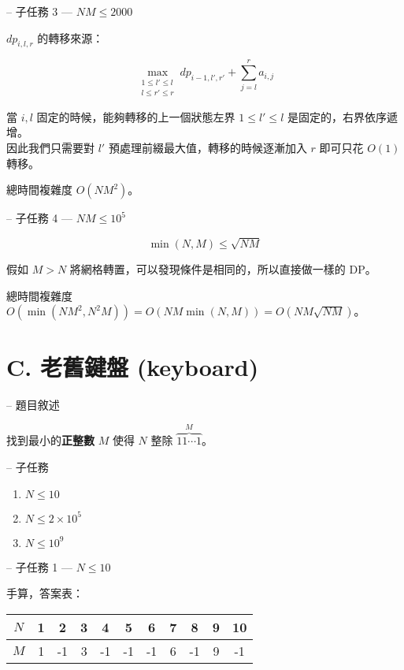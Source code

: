 \documentclass[hyperref,UTF8,notheorems,xcolor={dvipsnames}]{beamer}
\newcommand{\btitle}[1]{{\secname} -- #1}
\theoremstyle{definition}
\begin{document}
\begin{frame}[fragile]{\btitle{子任務 3 --- $NM \leq 2000$}}
	
	$dp_{i, l, r}$ 的轉移來源：
	
	\[ \max_{\substack{1 \leq l' \leq l \\ l \leq r' \leq r}} dp_{i-1, l', r'} + \sum_{j=l}^{r}a_{i,j} \]
	
	當 $i, l$ 固定的時候，能夠轉移的上一個狀態左界 $1 \leq l' \leq l$ 是固定的，右界依序遞增。\\
	因此我們只需要對 $l'$ 預處理前綴最大值，轉移的時候逐漸加入 $r$ 即可只花 $O(1)$ 轉移。

	總時間複雜度 $O(NM^2)$。  

\end{frame}

\begin{frame}[fragile]{\btitle{子任務 4 --- $NM \leq 10^5$}}
	
	\[ \min(N, M) \leq \sqrt{NM} \]

	假如 $M > N$ 將網格轉置，可以發現條件是相同的，所以直接做一樣的 DP。  

	總時間複雜度 $O(\min(NM^2, N^2M)) = O(NM\min(N, M)) = O(NM\sqrt{NM})$。  

\end{frame}

\section{C. 老舊鍵盤 (keyboard)}

\begin{frame}[fragile]{\btitle{題目敘述}}

	找到最小的\textbf{正整數} $M$ 使得 $N$ 整除 $\overset{M}{\overbrace{11\cdots1}}$。
\end{frame}

\begin{frame}[fragile]{\btitle{子任務}}
	\begin{enumerate}
		\item $N \leq 10$
		\item $N \leq 2 \times 10^5$
		\item $N \leq 10^9$
	\end{enumerate}
\end{frame}

\begin{frame}[fragile]{\btitle{子任務 1 --- $N \leq 10$}}
	
	手算，答案表：

	\begin{tabular}{c|c|c|c|c|c|c|c|c|c|c}
	$N$ & 1 & 2 & 3 & 4 & 5 & 6 & 7 & 8 & 9 & 10 \\
	\hline
	$M$ & 1 & -1 & 3 & -1 & -1 & -1 & 6 & -1 & 9 & -1
	\end{tabular}

\end{frame}
\end{document}
